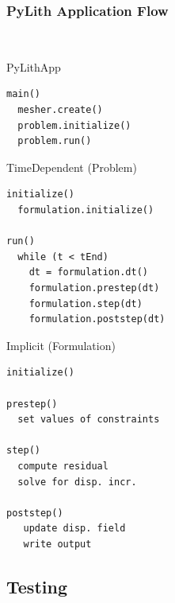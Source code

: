 \documentclass{beamer}
\begin{document}
\begin{frame}[fragile]
  \frametitle{PyLith Application Flow}
  \summary{}
 
{\small\tt
  \begin{minipage}[t]{2.0in}
      \begin{block}{PyLithApp}
        \begin{verbatim}
main()
  mesher.create()
  problem.initialize()
  problem.run()
\end{verbatim}
    \end{block}
    \begin{block}{TimeDependent (Problem)}
    \begin{verbatim}
initialize()
  formulation.initialize()

run()
  while (t < tEnd)
    dt = formulation.dt()
    formulation.prestep(dt)
    formulation.step(dt)
    formulation.poststep(dt)
\end{verbatim}
  \end{block}
\end{minipage}
  \hfill
  \begin{minipage}[t]{2.0in}
    \begin{block}{Implicit (Formulation)}
      \begin{verbatim}
initialize()

prestep()
  set values of constraints

step()
  compute residual
  solve for disp. incr.

poststep()
   update disp. field
   write output
\end{verbatim}
    \end{block}
  \end{minipage}
}

\end{frame}


\subsection{Testing}
\end{document}
